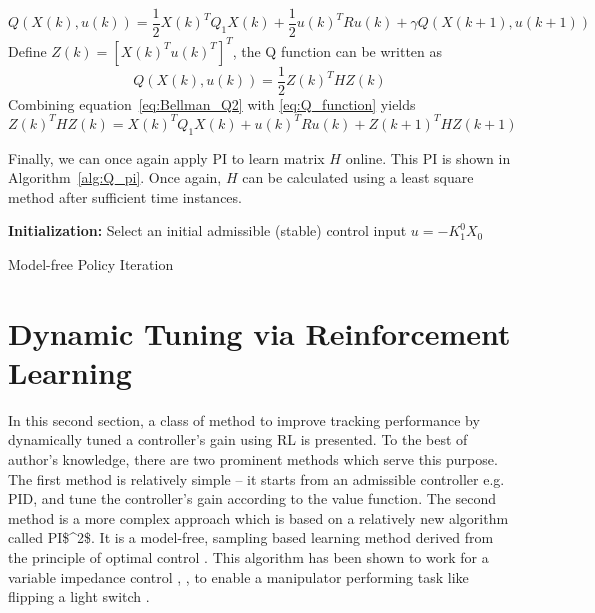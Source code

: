 \begin{equation}
Q(X(k), u(k)) = \frac{1}{2}X(k)^TQ_1X(k) + \frac{1}{2}u(k)^TRu(k) + \gamma Q(X(k+1), u(k+1))
\label{eq:Bellman_Q2}
\end{equation}
Define $Z(k) = \left[ X(k)^T u(k)^T\right]^T$, the Q function can be written as
\begin{equation}
Q(X(k),u(k)) = \frac{1}{2}Z(k)^THZ(k)
\label{eq:Q_function}
\end{equation}
Combining equation~\eqref{eq:Bellman_Q2} with \eqref{eq:Q_function} yields
\begin{equation}
Z(k)^THZ(k) = X(k)^TQ_1X(k) + u(k)^TRu(k) + Z(k+1)^THZ(k+1)
\end{equation}

Finally, we can once again apply \ac {PI} to learn matrix $H$ online. This \ac {PI} is shown in Algorithm~\ref{alg:Q_pi}. Once again, $H$ can be calculated using a least square method after sufficient time instances.

\begin{algorithm}[H]
	\textbf{Initialization:} Select an initial admissible (stable) control input $u = -K^0_1X_0$\\
	\label{alg:Q_pi}
	\caption{Model-free Policy Iteration}
\end{algorithm}


\section{Dynamic Tuning via Reinforcement Learning} \label{sec:dytun}
In this second section, a class of method to improve tracking performance by dynamically tuned a controller's gain using \ac {RL} is presented. To the best of author's knowledge, there are two prominent methods which serve this purpose. The first method is relatively simple -- it starts from an admissible controller e.g. \ac{PID}, and tune the controller's gain according to the value function. The second method is a more complex approach which is based on a relatively new algorithm called \ac {PI$^2$}. It is a model-free, sampling based learning method derived from the principle of optimal control \cite{Buchli2010}. This algorithm has been shown to work for a variable impedance control \cite{Buchli6037312}, \cite{buchli2011learning}, \cite{theodorou2010generalized} to enable a manipulator performing task like flipping a light switch \cite{buchli2011learning}.


